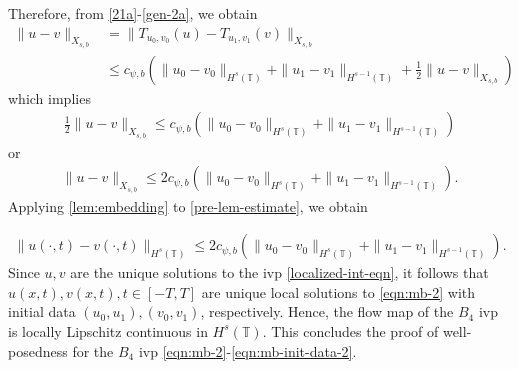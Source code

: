 \documentclass[12pt,reqno]{amsart}
\numberwithin{equation}{section}  %
\numberwithin{figure}{section}
\newcommand{\ci}{\mathbb{T}}
\theoremstyle{plain}
\theoremstyle{definition}
\theoremstyle{remark}
\begin{document}
%
%
Therefore, from \eqref{21a}-\eqref{gen-2a}, we obtain
%
%
\begin{equation*}
	\begin{split}
    \|u -v \|_{X_{s,b}}
    & = \|T_{u_0, v_0}(u) - T_{u_1, v_1}(v) \|_{X_{s,b}}
    \\
    & \le
    c_{\psi, b} \left( \|u_0 -v_0 \|_{H^s\left( \ci \right)} +\|u_1 -v_1
        \|_{H^{s-1}\left( \ci \right)} + \frac{1}{2} \|u -v \|_{X_{s,b}}\right)
  \end{split}
\end{equation*}
%
%
which implies
%
%
\begin{equation*}
	\begin{split}
		\frac{1}{2} \|u-v\|_{X_{s,b}} \le
    c_{\psi, b} \left( \|u_0 -v_0 \|_{H^s\left( \ci \right)} +\|u_1 -v_1
        \|_{H^{s-1}\left( \ci \right)} \right )
      \end{split}
\end{equation*}
%
%
or
%
%
\begin{equation}
	\begin{split}
		\|u -v \|_{X_{s,b}} \le 2 c_{\psi, b} \left( \|u_0 -v_0 \|_{H^s\left( \ci \right)} +\|u_1 -v_1
        \|_{H^{s-1}\left( \ci \right)} \right ).
	\end{split}
  \label{pre-lem-estimate}
\end{equation}
%
%
Applying  
\autoref{lem:embedding} to \eqref{pre-lem-estimate}, we obtain 

%
%
%
	 \begin{equation*}
		 \begin{split}
			\|u(\cdot, t) -v(\cdot, t) \|_{H^s(\ci)} \le
      2 c_{\psi, b} \left( \|u_0 -v_0 \|_{H^s\left( \ci \right)} +\|u_1 -v_1
        \|_{H^{s-1}\left( \ci \right)} \right ).
		 \end{split}
	 \end{equation*}
Since $u,v$ are the unique solutions to the ivp
\eqref{localized-int-eqn}, it follows that $u(x,t), v(x,t), t \in [-T, T]$ are unique
local solutions to \eqref{eqn:mb-2} with
initial data $(u_0, u_1), (v_0, v_1)$, respectively.
Hence, the flow map of the $B_4$ ivp is locally Lipschitz continuous in
$H^s(\ci)$. This
concludes the proof of well-posedness for the $B_4$ ivp
\eqref{eqn:mb-2}-\eqref{eqn:mb-init-data-2}. \qquad \qedsymbol

%
%
%
%
%
%
%
%
\end{document}
